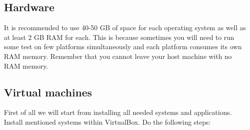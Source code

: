 \documentclass{article}[12pt]
\begin{document}
\subsection{Hardware}
It is recommended to use 40-50 GB of space for each operating system as well as at least 2 GB RAM for each. This is because sometimes you will need to
run some test on few platforms simultaneously and each platform consumes its own RAM memory. Remember that you cannot leave your host machine with no RAM memory.
\subsection{Virtual machines}

First of all we will start from installing all needed systems and applications. Install mentioned systems within VirtualBox. Do the following steps:
\end{document}
